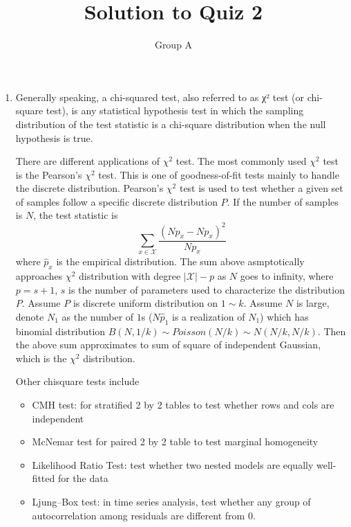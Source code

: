 \documentclass[10pt]{article}
\begin{document}
\title{Solution to Quiz 2}
\author{Group A}
\maketitle

\begin{enumerate}
\item %
Generally speaking, a chi-squared test, also referred to as χ² test (or chi-square test), is any statistical hypothesis test in which the sampling distribution of the test statistic is a chi-square distribution when the null hypothesis is true.

There are different applications of $\chi^2$ test. The most commonly used $\chi^2$ test is the Pearson's $\chi^2$ test. This is one of goodness-of-fit tests mainly to handle the discrete distribution. Pearson's $\chi^2$ test is used to test whether a given set of samples follow a specific discrete distribution $P$. If the number of samples is $N$, the test statistic is 
$$\sum_{x\in\mathcal{X}}\frac{(N\hat{p}_x-Np_x)^2}{Np_x}$$
where $\hat{p}_x$ is the empirical distribution. The sum above asmptotically approaches $\chi^2$ distribution with degree $|\mathcal{X}|-p$ as $N$ goes to infinity, where $p=s+1$, $s$ is the number of parameters used to characterize the distribution $P$. Assume $P$ is discrete uniform distribution on $1\sim k$. Assume $N$ is large, denote $N_1$ as the number of $1$s ($N\hat{p}_1$ is a realization of $N_1$) which has binomial distribution $B(N, 1/k)\sim Poisson(N/k)\sim N(N/k, N/k)$. Then the above sum approximates to sum of square of independent Gaussian, which is the $\chi^2$ distribution.

Other chisquare tests include
\begin{itemize}
\item CMH test: for stratified 2 by 2 tables to test whether rows and cols are independent
\item McNemar test for paired 2 by 2 table to test marginal homogeneity
\item Likelihood Ratio Test: test whether two nested models are equally well-fitted for the data
\item Ljung–Box test: in time series analysis, test whether any group of autocorrelation among residuals are different from 0. 
\end{itemize}


\end{enumerate}
\end{document}
